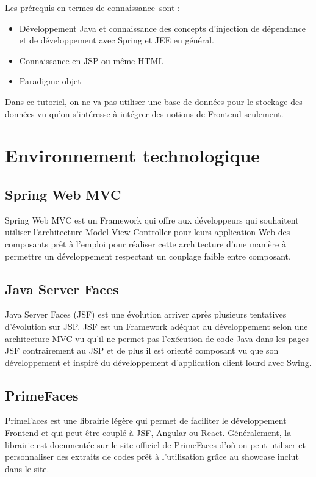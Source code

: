 \documentclass[12pt]{article}
\begin{document}
Les prérequis en termes de connaissance sont :\par

\begin{itemize}
	\item Développement Java et connaissance des concepts d’injection de dépendance et de développement avec Spring et JEE en général.\par

	\item Connaissance en JSP ou même HTML\par

	\item Paradigme objet
\end{itemize}\par

Dans ce tutoriel, on ne va pas utiliser une base de données pour le stockage des données vu qu’on s’intéresse à intégrer des notions de Frontend seulement.\par

\section{Environnement technologique}
\subsection{Spring Web MVC}
Spring Web MVC est un Framework qui offre aux développeurs qui souhaitent utiliser l’architecture Model-View-Controller pour leurs application Web des composants prêt à l’emploi pour réaliser cette architecture d’une manière à permettre un développement respectant un couplage faible entre composant.\par

\subsection{Java Server Faces}
Java Server Faces (JSF) est une évolution arriver après plusieurs tentatives d’évolution sur JSP. JSF est un Framework adéquat au développement selon une architecture MVC vu qu’il ne permet pas l’exécution de code Java dans les pages JSF contrairement au JSP et de plus il est orienté composant vu que son développement et inspiré du développement d’application client lourd avec Swing.\par

\subsection{PrimeFaces}
PrimeFaces est une librairie légère qui permet de faciliter le développement Frontend et qui peut être couplé à JSF, Angular ou React. Généralement, la librairie est documentée sur le site officiel de PrimeFaces d’où on peut utiliser et personnaliser des extraits de codes prêt à l’utilisation grâce au showcase inclut dans le site.\par
\end{document}
